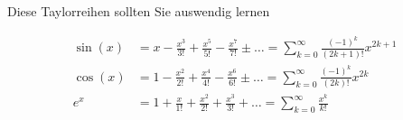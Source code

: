 \begin{satz}
	{Diese Taylorreihen sollten Sie auswendig lernen}{}

	\begin{align*}
		\sin(x) & = x - \frac{x^3}{3!} + \frac{x^5}{5!} - \frac{x^7}{7!} \pm \ldots = \sum_{k=0}^{\infty} \frac{(-1)^k}{(2k+1)!} x^{2k+1} \\
		\cos(x) & = 1 - \frac{x^2}{2!} + \frac{x^4}{4!} - \frac{x^6}{6!} \pm \ldots = \sum_{k=0}^{\infty} \frac{(-1)^k}{(2k)!} x^{2k}     \\
		e^x     & = 1 + \frac{x}{1!} + \frac{x^2}{2!} + \frac{x^3}{3!} + \ldots = \sum_{k=0}^{\infty} \frac{x^k}{k!}
	\end{align*}

\end{satz}















